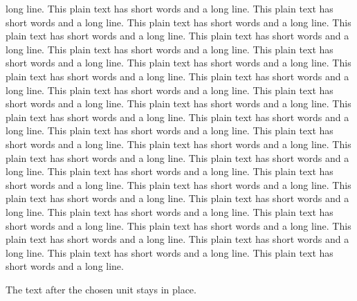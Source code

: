 \documentclass[11pt]{article}
\begin{document}
long line. This plain text has short words and a long line. This plain text has short words and a long line. This plain text has short words and a long line. This plain text has short words and a long line. This plain text has short words and a long line. This plain text has short words and a long line. This plain text has short words and a long line. This plain text has short words and a long line. This plain text has short words and a long line. This plain text has short words and a long line. This plain text has short words and a long line. This plain text has short words and a long line. This plain text has short words and a long line. This plain text has short words and a long line. This plain text has short words and a long line. This plain text has short words and a long line. This plain text has short words and a long line. This plain text has short words and a long line. This plain text has short words and a long line. This plain text has short words and a long line. This plain text has short words and a long line. This plain text has short words and a long line. This plain text has short words and a long line. This plain text has short words and a long line. This plain text has short words and a long line. This plain text has short words and a long line. This plain text has short words and a long line. This plain text has short words and a long line. This plain text has short words and a long line. This plain text has short words and a long line. This plain text has short words and a long line. This plain text has short words and a long line.


\par\vspace{25mm}
The text after the chosen unit stays in place.
\end{document}
